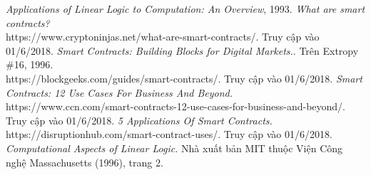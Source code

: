 \documentclass[a4paper]{article}
\begin{document}
\newpage
{}
\begin{thebibliography}{99999}
 {\em Applications of Linear Logic to Computation: An Overview}, 1993.
 {\em What are smart contracts?}\\
{https://www.cryptoninjas.net/what-are-smart-contracts/}. Truy cập vào 01/6/2018.
 {\em Smart Contracts: Building Blocks for Digital Markets.}. Trên Extropy \#16, 1996.
\\ {https://blockgeeks.com/guides/smart-contracts/}. Truy cập vào 01/6/2018.
 {\em Smart Contracts: 12 Use Cases For Business And Beyond.}\\
{https://www.ccn.com/smart-contracts-12-use-cases-for-business-and-beyond/}. Truy cập vào 01/6/2018.
 {\em 5 Applications Of Smart Contracts.}\\
{https://disruptionhub.com/smart-contract-uses/}. Truy cập vào 01/6/2018.
 {\em Computational Aspects of Linear Logic.} Nhà xuất bản MIT thuộc Viện Công nghệ Massachusetts (1996), trang 2.

\end{thebibliography}
\end{document}
